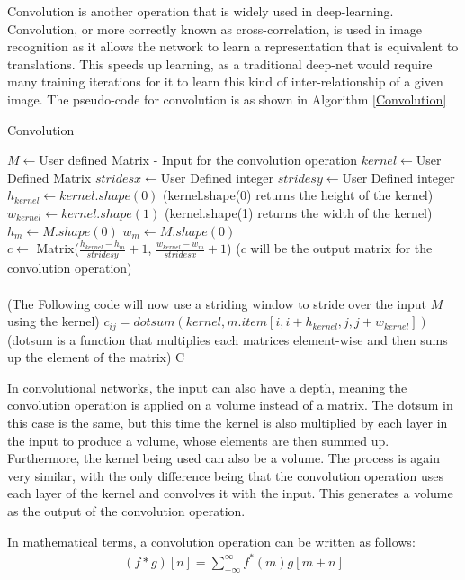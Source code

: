  \label{SConvolution}
Convolution is another operation that is widely used in deep-learning. Convolution, or more correctly known as cross-correlation, is used in image recognition as it allows the network to learn a representation that is equivalent to translations. This speeds up learning, as a traditional deep-net would require many training iterations for it to learn this kind of inter-relationship of a given image. The pseudo-code for convolution is as shown in Algorithm \ref{Convolution}
\begin{algorithm}[H]
\caption{Convolution}\label{Convolution}
\begin{algorithmic}[1]
\State $M \gets $User defined Matrix - Input for the convolution operation
\State $kernel \gets $User Defined Matrix
\State $stridesx \gets$User Defined integer
\State $stridesy \gets$User Defined integer
\\
\State $h_{kernel} \gets kernel.shape(0)$ (kernel.shape(0) returns the height of the kernel)
\State $w_{kernel} \gets kernel.shape(1)$ (kernel.shape(1) returns the width of the kernel)
\State $h_m \gets M.shape(0)$
\State $w_m \gets M.shape(0)$
\\
\State $c \gets $ Matrix($\frac{h_{kernel} - h_{m}}{stridesy} + 1$, $\frac{w_{kernel} - w_{m}}{stridesx} + 1$) ($c$ will be the output matrix for the convolution operation)
\\ \\
(The Following code will now use a striding window to stride over the input $M$ using the kernel)
\State $c_{ij} = dotsum(kernel, m.item[i, i+h_{kernel}, j, j+w_{kernel}])$ (dotsum is a function that multiplies each matrices element-wise and then sums up the element of the matrix)
\EndFor
\EndFor
\Return C
\end{algorithmic}
\end{algorithm}

In convolutional networks, the input can also have a depth, meaning the convolution operation is applied on a volume instead of a matrix. The dotsum in this case is the same, but this time the kernel is also multiplied by each layer in the input to produce a volume, whose elements are then summed up. Furthermore, the kernel being used can also be a volume. The process is again very similar, with the only difference being that the convolution operation uses each layer of the kernel and convolves it with the input. This generates a volume as the output of the convolution operation.

In mathematical terms, a convolution operation can be written as follows:
\begin{align}
    (f*g)[n] = \sum_{-\infty}^{\infty} f^{*}(m)g[m+n]
\end{align}